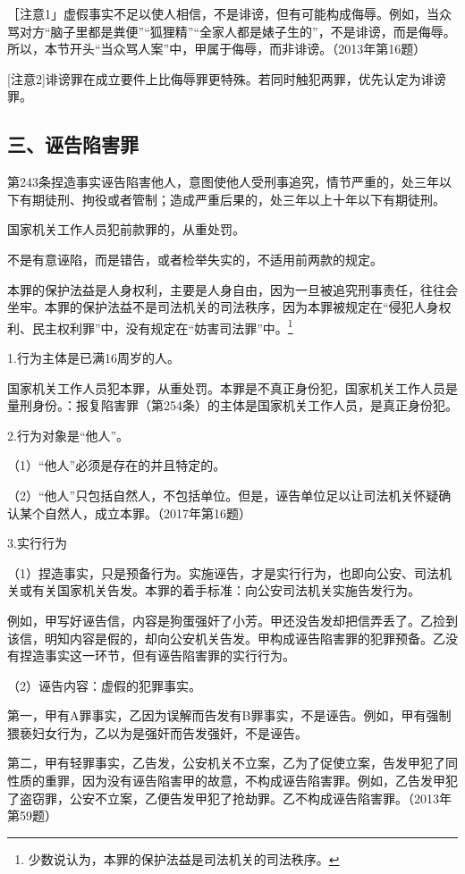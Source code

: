 ［注意1」虚假事实不足以使人相信，不是诽谤，但有可能构成侮辱。例如，当众骂对方“脑子里都是粪便”“狐狸精”“全家人都是婊子生的”，不是诽谤，而是侮辱。所以，本节开头“当众骂人案”中，甲属于侮辱，而非诽谤。（2013年第16题）

[注意2]诽谤罪在成立要件上比侮辱罪更特殊。若同时触犯两罪，优先认定为诽谤罪。

\subsection*{三、诬告陷害罪}

第243条捏造事实诬告陷害他人，意图使他人受刑事追究，情节严重的，处三年以下有期徒刑、拘役或者管制；造成严重后果的，处三年以上十年以下有期徒刑。

国家机关工作人员犯前款罪的，从重处罚。

不是有意诬陷，而是错告，或者检举失实的，不适用前两款的规定。

本罪的保护法益是人身权利，主要是人身自由，因为一旦被追究刑事责任，往往会坐牢。本罪的保护法益不是司法机关的司法秩序，因为本罪被规定在“侵犯人身权利、民主权利罪”中，没有规定在“妨害司法罪”中。\footnote{少数说认为，本罪的保护法益是司法机关的司法秩序。}

1.行为主体是已满16周岁的人。

国家机关工作人员犯本罪，从重处罚。本罪是不真正身份犯，国家机关工作人员是量刑身份。：报复陷害罪（第254条）的主体是国家机关工作人员，是真正身份犯。

2.行为对象是“他人”。

（1）“他人”必须是存在的并且特定的。

（2）“他人”只包括自然人，不包括单位。但是，诬告单位足以让司法机关怀疑确认某个自然人，成立本罪。（2017年第16题）

3.实行行为

（1）捏造事实，只是预备行为。实施诬告，才是实行行为，也即向公安、司法机关或有关国家机关告发。本罪的着手标准：向公安司法机关实施告发行为。

例如，甲写好诬告信，内容是狗蛋强奸了小芳。甲还没告发却把信弄丢了。乙捡到该信，明知内容是假的，却向公安机关告发。甲构成诬告陷害罪的犯罪预备。乙没有捏造事实这一环节，但有诬告陷害罪的实行行为。

（2）诬告内容：虚假的犯罪事实。

第一，甲有A罪事实，乙因为误解而告发有B罪事实，不是诬告。例如，甲有强制猥亵妇女行为，乙以为是强奸而告发强奸，不是诬告。

第二，甲有轻罪事实，乙告发，公安机关不立案，乙为了促使立案，告发甲犯了同性质的重罪，因为没有诬告陷害甲的故意，不构成诬告陷害罪。例如，乙告发甲犯了盗窃罪，公安不立案，乙便告发甲犯了抢劫罪。乙不构成诬告陷害罪。（2013年第59题）

